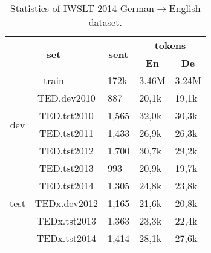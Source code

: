 \begin{table}[h]
    \centering
    \begin{tabular}{@{}cclll@{}}
        \toprule
        \multicolumn{2}{c}{\multirow{2}{*}{\textbf{set}}} & \multicolumn{1}{c}{\multirow{2}{*}{\textbf{sent}}} & \multicolumn{2}{c}{\textbf{tokens}}                                           \\ %
        \multicolumn{2}{c}{}                              & \multicolumn{1}{c}{}                               & \multicolumn{1}{c}{\textbf{En}}     & \multicolumn{1}{c}{\textbf{De}}         \\ \toprule
        \multicolumn{2}{c}{train}                         & 172k                                               & 3.46M                               & 3.24M                                   \\ \midrule
        \multirow{4}{*}{dev}                              & TED.dev2010                                        & 887                                 & 20,1k                           & 19,1k \\
                                                          & TED.tst2010                                        & 1,565                               & 32,0k                           & 30,3k \\
                                                          & TED.tst2011                                        & 1,433                               & 26,9k                           & 26,3k \\
                                                          & TED.tst2012                                        & 1,700                               & 30,7k                           & 29,2k \\ \midrule
        \multirow{5}{*}{test}                             & TED.tst2013                                        & 993                                 & 20,9k                           & 19,7k \\
                                                          & TED.tst2014                                        & 1,305                               & 24,8k                           & 23,8k \\
                                                          & TEDx.dev2012                                       & 1,165                               & 21,6k                           & 20,8k \\
                                                          & TEDx.tst2013                                       & 1,363                               & 23,3k                           & 22,4k \\
                                                          & TEDx.tst2014                                       & 1,414                               & 28,1k                           & 27,6k \\ \bottomrule
    \end{tabular}
    \caption{Statistics of IWSLT 2014 German$\rightarrow$English dataset.}
    \label{tab:iwslt14stat}
\end{table}

